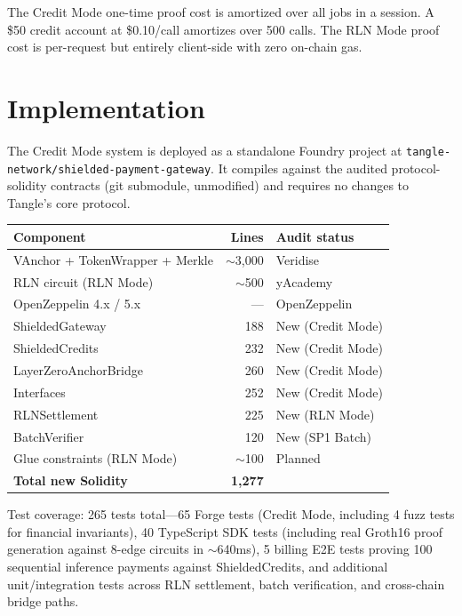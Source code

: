 \documentclass[11pt,a4paper]{article}
\theoremstyle{definition}
\begin{document}
The Credit Mode one-time proof cost is amortized over all jobs in a session. A \$50 credit account at \$0.10/call amortizes over 500 calls. The RLN Mode proof cost is per-request but entirely client-side with zero on-chain gas.

\section{Implementation}

The Credit Mode system is deployed as a standalone Foundry project at \texttt{tangle-network/shielded-payment-gateway}. It compiles against the audited protocol-solidity contracts (git submodule, unmodified) and requires no changes to Tangle's core protocol.

\begin{center}
\begin{tabular}{@{}lrl@{}}
\toprule
\textbf{Component} & \textbf{Lines} & \textbf{Audit status} \\
\midrule
VAnchor + TokenWrapper + Merkle & $\sim$3,000 & Veridise~\cite{veridise} \\
RLN circuit (RLN Mode) & $\sim$500 & yAcademy~\cite{rlnaudit} \\
OpenZeppelin 4.x / 5.x & --- & OpenZeppelin \\
\midrule
ShieldedGateway & 188 & New (Credit Mode) \\
ShieldedCredits & 232 & New (Credit Mode) \\
LayerZeroAnchorBridge & 260 & New (Credit Mode) \\
Interfaces & 252 & New (Credit Mode) \\
RLNSettlement & 225 & New (RLN Mode) \\
BatchVerifier & 120 & New (SP1 Batch) \\
\midrule
Glue constraints (RLN Mode) & $\sim$100 & Planned \\
\midrule
\textbf{Total new Solidity} & \textbf{1,277} & \\
\bottomrule
\end{tabular}
\end{center}

Test coverage: 265 tests total---65 Forge tests (Credit Mode, including 4 fuzz tests for financial invariants), 40 TypeScript SDK tests (including real Groth16 proof generation against 8-edge circuits in $\sim$640ms), 5 billing E2E tests proving 100 sequential inference payments against ShieldedCredits, and additional unit/integration tests across RLN settlement, batch verification, and cross-chain bridge paths.
\end{document}

